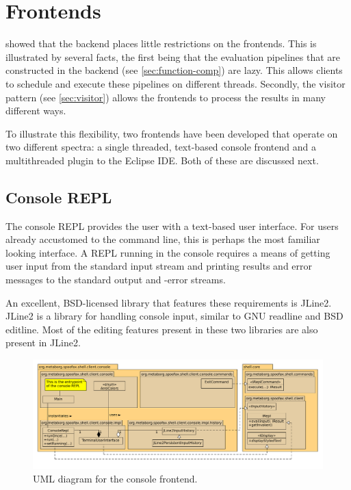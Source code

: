 \section{Frontends}
\label{sec:frontends}

 showed that the backend places little restrictions on the
frontends. This is illustrated by several facts, the first being that the
evaluation pipelines that are constructed in the backend (see
\cref{sec:function-comp}) are lazy. This allows clients to schedule and execute
these pipelines on different threads. Secondly, the visitor pattern (see
\cref{sec:visitor}) allows the frontends to process the results in many
different ways.

To illustrate this flexibility, two frontends have been developed that operate
on two different spectra: a single threaded, text-based console frontend and a
multithreaded plugin to the Eclipse IDE. Both of these are discussed next.

\subsection{Console REPL}
\label{ssec:consolerepl}


The console REPL provides the user with a text-based user interface. For users
already accustomed to the command line, this is perhaps the most familiar
looking interface. A REPL running in the console requires a means of getting
user input from the standard input stream and printing results and error
messages to the standard output and -error streams.

An excellent, BSD-licensed library that features these requirements is JLine2.
JLine2 is a library for handling console input, similar to GNU readline and BSD
editline. Most of the editing features present in these two libraries are also
present in JLine2.

\begin{figure}[h]
  \includegraphics[width=\textwidth]{uml-console}
  \caption{UML diagram for the console frontend.}
  \label{fig:uml-console}
\end{figure}

